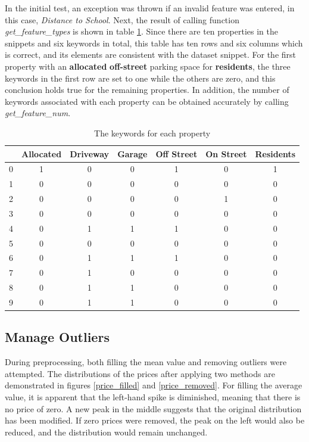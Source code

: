 \documentclass[12pt,twoside]{report}
\begin{document}
In the initial test, an exception was thrown if an invalid feature was entered, in this case, \textit{Distance to School}. Next, the result of calling function \textit{get\_feature\_types} is shown in table \ref{parking_types}. Since there are ten properties in the snippets and six keywords in total, this table has ten rows and six columns which is correct, and its elements are consistent with the dataset snippet. For the first property with an \textbf{allocated} \textbf{off-street} parking space for \textbf{residents}, the three keywords in the first row are set to one while the others are zero, and this conclusion holds true for the remaining properties. In addition, the number of keywords associated with each property can be obtained accurately by calling \textit{get\_feature\_num}. 

\begin{table}[h]
	\centering
	\caption{The keywords for each property}
	\label{parking_types}
	\begin{tabular}{| c | c | c | c | c | c | c |}
		\hline
		& Allocated & Driveway & Garage & Off Street & On Street & Residents\\
		\hline
		0 & 1 & 0 & 0 & 1 & 0 & 1 \\ 
		\hline
		1 & 0 & 0 & 0 & 0 & 0 & 0 \\
		\hline
		2 & 0 & 0 & 0 & 0 & 1 & 0 \\
		\hline
		3 & 0 & 0 & 0 & 0 & 0 & 0 \\
		\hline
		4 & 0 & 1 & 1 & 1 & 0 & 0 \\
		\hline
		5 & 0 & 0 & 0 & 0 & 0 & 0 \\
		\hline
		6 & 0 & 1 & 1 & 1 & 0 & 0 \\
		\hline
		7 & 0 & 1 & 0 & 0 & 0 & 0 \\
		\hline
		8 & 0 & 1 & 1 & 0 & 0 & 0 \\
		\hline
		9 & 0 & 1 & 1 & 0 & 0 & 0 \\
		\hline
	\end{tabular}
\end{table}

\subsection{Manage Outliers}
During preprocessing, both filling the mean value and removing outliers were attempted. The distributions of the prices after applying two methods are demonstrated in figures \ref{price_filled} and \ref{price_removed}. For filling the average value, it is apparent that the left-hand spike is diminished, meaning that there is no price of zero. A new peak in the middle suggests that the original distribution has been modified. If zero prices were removed, the peak on the left would also be reduced, and the distribution would remain unchanged. 
\\
\end{document}
